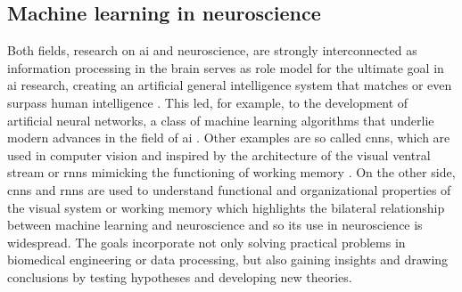 \subsection{Machine learning in neuroscience}
Both fields, research on \gls{ai} and neuroscience, are strongly interconnected as information processing in the brain serves as role model for the ultimate goal in \gls{ai} research, creating an artificial general intelligence system that matches or even surpass human intelligence \cite{Macpherson2021}. This led, for example, to the development of artificial neural networks, a class of machine learning algorithms that underlie modern advances in the field of \gls{ai} \cite{Cox2014}. Other examples are so called \glspl{cnn}, which are used in computer vision and inspired by the architecture of the visual ventral stream or \glspl{rnn} mimicking the functioning of working memory \cite{Macpherson2021, Fukushima1982, Yin2020}. On the other side, \glspl{cnn} and \glspl{rnn} are used to understand functional and organizational properties of the visual system \cite{Yamins2014} or working memory \cite{Kim2021} which highlights the bilateral relationship between machine learning and neuroscience and so its use in neuroscience is widespread. The goals incorporate not only solving practical problems in biomedical engineering or data processing, but also gaining insights and drawing conclusions by testing hypotheses and developing new theories.\\
